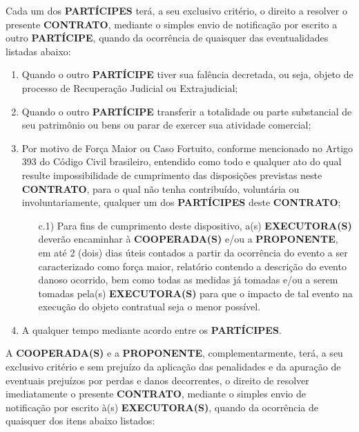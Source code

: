 

\xx Cada um dos \textbf{PARTÍCIPES} terá, a seu exclusivo critério, o direito a resolver o presente \textbf{CONTRATO}, mediante o simples envio de notificação por escrito a outro \textbf{PARTÍCIPE}, quando da ocorrência de quaisquer das eventualidades listadas abaixo:

\begin{enumerate}[label=\alph*),]
    \item Quando o outro \textbf{PARTÍCIPE} tiver sua falência decretada, ou seja, objeto de processo de Recuperação Judicial ou Extrajudicial;
    \item Quando o outro \textbf{PARTÍCIPE} transferir a totalidade ou parte substancial de seu patrimônio ou bens ou parar de exercer sua atividade comercial;
    \item Por motivo de Força Maior ou Caso Fortuito, conforme mencionado no Artigo 393 do Código Civil brasileiro, entendido como todo e qualquer ato do qual resulte impossibilidade de cumprimento das disposições previstas neste \textbf{CONTRATO}, para o qual não tenha contribuído, voluntária ou involuntariamente, qualquer um dos \textbf{PARTÍCIPES} deste \textbf{CONTRATO};
          \begin{enumerate}
              \item[c.1)] Para fins de cumprimento deste dispositivo, a(s) \textbf{EXECUTORA(S)} deverão encaminhar à \textbf{COOPERADA(S)} e/ou a \textbf{PROPONENTE}, em até 2 (dois) dias úteis contados a partir da ocorrência do evento a ser caracterizado como força maior, relatório contendo a descrição do evento danoso ocorrido, bem como todas as medidas já tomadas e/ou a serem tomadas pela(s) \textbf{EXECUTORA(S)} para que o impacto de tal evento na execução do objeto contratual seja o menor possível.

          \end{enumerate}
    \item A qualquer tempo mediante acordo entre os \textbf{PARTÍCIPES}.

\end{enumerate}

\xx A \textbf{COOPERADA(S)} e a \textbf{PROPONENTE}, complementarmente, terá, a seu exclusivo critério e sem prejuízo da aplicação das penalidades e da apuração de eventuais prejuízos por perdas e danos decorrentes, o direito de resolver imediatamente o presente \textbf{CONTRATO}, mediante o simples envio de notificação por escrito à(s) \textbf{EXECUTORA(S)}, quando da ocorrência de quaisquer dos itens abaixo listados:

